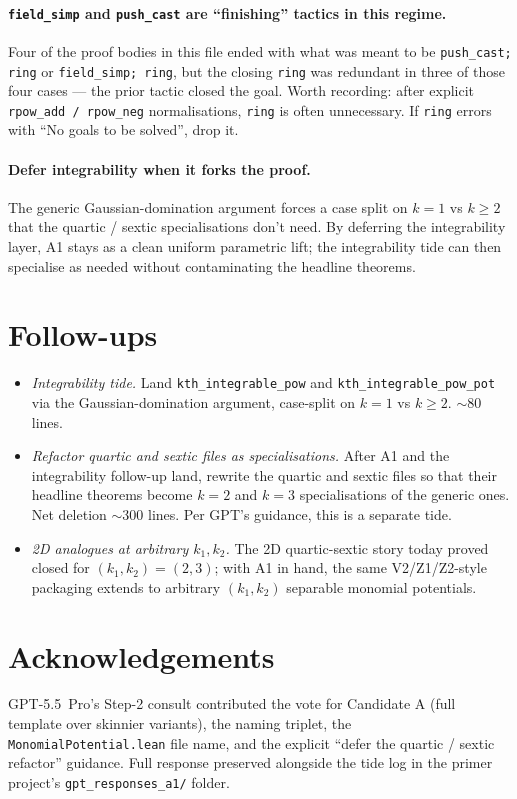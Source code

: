\documentclass[11pt]{article}
\begin{document}
\paragraph{\texttt{field\_simp} and \texttt{push\_cast} are
``finishing'' tactics in this regime.} Four of the proof bodies in
this file ended with what was meant to be \texttt{push\_cast; ring}
or \texttt{field\_simp; ring}, but the closing \texttt{ring} was
redundant in three of those four cases --- the prior tactic closed
the goal. Worth recording: after explicit \texttt{rpow\_add /
rpow\_neg} normalisations, \texttt{ring} is often unnecessary. If
\texttt{ring} errors with ``No goals to be solved'', drop it.

\paragraph{Defer integrability when it forks the proof.} The generic
Gaussian-domination argument forces a case split on $k = 1$ vs
$k \ge 2$ that the quartic / sextic specialisations don't need. By
deferring the integrability layer, A1 stays as a clean uniform
parametric lift; the integrability tide can then specialise as
needed without contaminating the headline theorems.

\section{Follow-ups}

\begin{itemize}[leftmargin=1.5em]
\item \emph{Integrability tide.} Land
  \texttt{kth\_integrable\_pow} and \texttt{kth\_integrable\_pow\_pot}
  via the Gaussian-domination argument, case-split on $k = 1$ vs
  $k \ge 2$. ${\sim}80$ lines.
\item \emph{Refactor quartic and sextic files as specialisations.}
  After A1 and the integrability follow-up land, rewrite the quartic
  and sextic files so that their headline theorems become $k = 2$
  and $k = 3$ specialisations of the generic ones. Net deletion
  ${\sim}300$ lines. Per GPT's guidance, this is a separate tide.
\item \emph{2D analogues at arbitrary $k_1, k_2$.} The 2D
  quartic-sextic story today proved closed for $(k_1, k_2) = (2, 3)$;
  with A1 in hand, the same V2/Z1/Z2-style packaging extends to
  arbitrary $(k_1, k_2)$ separable monomial potentials.
\end{itemize}

\section*{Acknowledgements}

GPT-5.5~Pro's Step-2 consult contributed the vote for Candidate A
(full template over skinnier variants), the naming triplet, the
\texttt{MonomialPotential.lean} file name, and the explicit
``defer the quartic / sextic refactor'' guidance. Full response
preserved alongside the tide log in the primer project's
\texttt{gpt\_responses\_a1/} folder.
\end{document}
